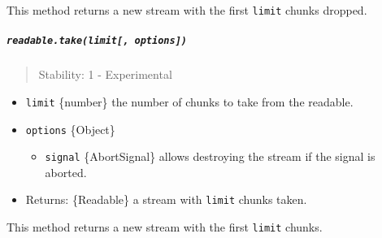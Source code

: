This method returns a new stream with the first \texttt{limit} chunks
dropped.

\begin{Shaded}
\begin{Highlighting}[]
 \OperatorTok{;}

\NormalTok{([}\OperatorTok{,} \OperatorTok{,} \OperatorTok{,} \NormalTok{])}\NormalTok{(}\NormalTok{)}\NormalTok{()}\OperatorTok{;} \CommentTok{// [3, 4]}
\end{Highlighting}
\end{Shaded}

\subparagraph{\texorpdfstring{\texttt{readable.take(limit{[},\ options{]})}}{readable.take(limit{[}, options{]})}}\label{readable.takelimit-options}

\begin{quote}
Stability: 1 - Experimental
\end{quote}

\begin{itemize}
\tightlist
\item
  \texttt{limit} \{number\} the number of chunks to take from the
  readable.
\item
  \texttt{options} \{Object\}

  \begin{itemize}
  \tightlist
  \item
    \texttt{signal} \{AbortSignal\} allows destroying the stream if the
    signal is aborted.
  \end{itemize}
\item
  Returns: \{Readable\} a stream with \texttt{limit} chunks taken.
\end{itemize}

This method returns a new stream with the first \texttt{limit} chunks.

\begin{Shaded}
\begin{Highlighting}[]
 \OperatorTok{;}

\NormalTok{([}\OperatorTok{,} \OperatorTok{,} \OperatorTok{,} \NormalTok{])}\NormalTok{(}\NormalTok{)}\NormalTok{()}\OperatorTok{;} \CommentTok{// [1, 2]}
\end{Highlighting}
\end{Shaded}

